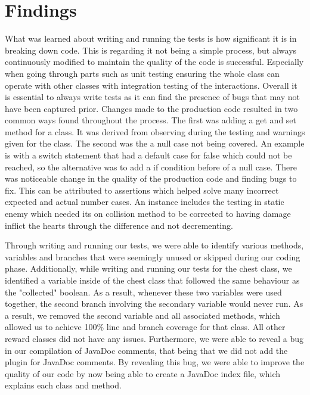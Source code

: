 \documentclass[12pt,letterpaper]{article}
\begin{document}
\section{Findings}
What was learned about writing and running the tests is how significant it is in breaking down code. This is regarding it not being a simple process, but always continuously modified to maintain the quality of the code is successful. Especially when going through parts such as unit testing ensuring the whole class can operate with other classes with integration testing of the interactions. Overall it is essential to always write tests as it can find the presence of bugs that may not have been captured prior. Changes made to the production code resulted in two common ways found throughout the process. The first was adding a get and set method for a class. It was derived from observing during the testing and warnings given for the class. The second was the a null case not being covered. An example is with a switch statement that had a default case for false which could not be reached, so the alternative was to add a if condition before of a null case. There was noticeable change in the quality of the production code and finding bugs to fix. This can be attributed to assertions which helped solve many incorrect expected and actual number cases. An instance includes the testing in static enemy which needed its on collision method to be corrected to having damage inflict the hearts through the difference and not decrementing.

Through writing and running our tests, we were able to identify various methods, variables and branches that were seemingly unused or skipped during our coding phase.
Additionally, while writing and running our tests for the chest class, we identified a variable inside of the chest class that followed the same behaviour as the "collected" boolean. As a result, whenever these two variables were used together, the second branch involving the secondary variable would never run. As a result, we removed the second variable and all associated methods, which allowed us to achieve 100\% line and branch coverage for that class. All other reward classes did not have any issues.
Furthermore, we were able to reveal a bug in our compilation of JavaDoc comments, that being that we did not add the plugin for JavaDoc comments. By revealing this bug, we were able to improve the quality of our code by now being able to create a JavaDoc index file, which explains each class and method.

\end{document}
